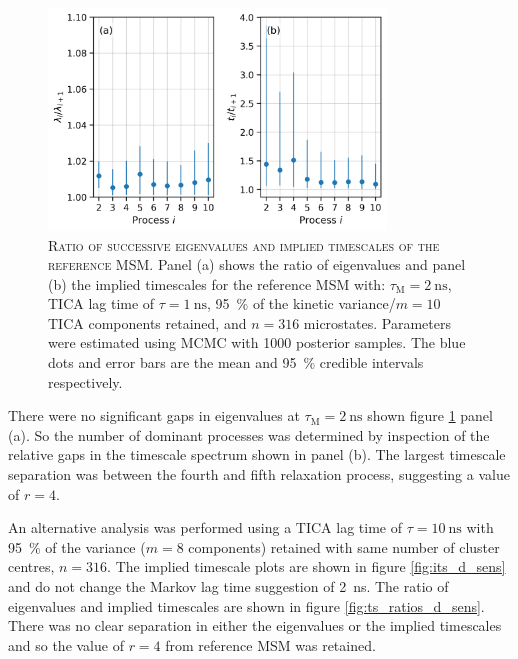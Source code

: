 \begin{figure}
    \centering
    \includegraphics[width=0.8\textwidth]{chapters/aadh/figures/timescale_ratios_D.png}
    \caption[Ratio of successive eigenvalues and implied timescales of the reference MSM]{\textsc{Ratio of successive eigenvalues and implied timescales of the reference MSM}. Panel (a) shows the ratio of eigenvalues and panel (b) the implied timescales for the reference MSM with: $\tau_{\textrm{M}}=\SI{2}{\nano\second}$, TICA lag time of $\tau=\SI{1}{\nano\second}$, \SI{95}{\percent} of the kinetic variance/$m=10$ TICA components retained, and $n=316$ microstates. Parameters were estimated using MCMC with \num{1000} posterior samples. The blue dots and error bars are the mean and \SI{95}{\percent} credible intervals respectively.}
    \label{fig:ts_ratios_d}
\end{figure}

There were no significant gaps in eigenvalues at $\tau_{\mathrm{M}}=\SI{2}{\nano\second}$  shown figure \ref{fig:ts_ratios_d} panel (a). So the number of dominant processes was determined by inspection of the relative gaps in the timescale spectrum shown in  panel (b). The largest timescale separation was between the fourth and fifth relaxation process, suggesting a value of $r=4$. 

An alternative analysis was performed using a TICA lag time of $\tau=\SI{10}{\nano\second}$ with \SI{95}{\percent} of the variance ($m=8$ components) retained with same number of cluster centres, $n=316$. The implied timescale plots are shown in figure \ref{fig:its_d_sens} and  do not change the Markov lag time suggestion of \SI{2}{\nano\second}. The ratio of eigenvalues and implied timescales  are shown in figure \ref{fig:ts_ratios_d_sens}. There was no clear separation in either the eigenvalues or the implied timescales and so the value of $r=4$ from reference MSM was retained.

